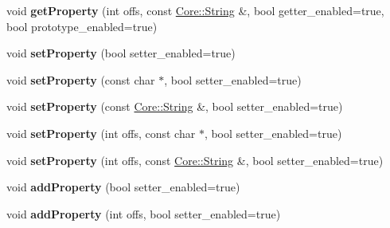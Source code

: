 \begin{DoxyCompactItemize}
\item 
void {\bfseries get\+Property} (int offs, const \hyperlink{class_object_script_1_1_o_s_1_1_core_1_1_string}{Core\+::\+String} \&, bool getter\+\_\+enabled=true, bool prototype\+\_\+enabled=true)\hypertarget{class_object_script_1_1_o_s_aa1d8e395f186e6a89b3d6b282f10697e}{}\label{class_object_script_1_1_o_s_aa1d8e395f186e6a89b3d6b282f10697e}

\item 
void {\bfseries set\+Property} (bool setter\+\_\+enabled=true)\hypertarget{class_object_script_1_1_o_s_a05fb5664fdfe69bc4eb09a4e045d1c22}{}\label{class_object_script_1_1_o_s_a05fb5664fdfe69bc4eb09a4e045d1c22}

\item 
void {\bfseries set\+Property} (const char $\ast$, bool setter\+\_\+enabled=true)\hypertarget{class_object_script_1_1_o_s_a3f09b948d4574c3669be6f2f16286718}{}\label{class_object_script_1_1_o_s_a3f09b948d4574c3669be6f2f16286718}

\item 
void {\bfseries set\+Property} (const \hyperlink{class_object_script_1_1_o_s_1_1_core_1_1_string}{Core\+::\+String} \&, bool setter\+\_\+enabled=true)\hypertarget{class_object_script_1_1_o_s_ac48a730971463f16f6ab1e92e48fb5db}{}\label{class_object_script_1_1_o_s_ac48a730971463f16f6ab1e92e48fb5db}

\item 
void {\bfseries set\+Property} (int offs, const char $\ast$, bool setter\+\_\+enabled=true)\hypertarget{class_object_script_1_1_o_s_a8174c756017c9c8793c735b4dcd29d9a}{}\label{class_object_script_1_1_o_s_a8174c756017c9c8793c735b4dcd29d9a}

\item 
void {\bfseries set\+Property} (int offs, const \hyperlink{class_object_script_1_1_o_s_1_1_core_1_1_string}{Core\+::\+String} \&, bool setter\+\_\+enabled=true)\hypertarget{class_object_script_1_1_o_s_a37bd9a57e59f449b0c6940863f7bc49d}{}\label{class_object_script_1_1_o_s_a37bd9a57e59f449b0c6940863f7bc49d}

\item 
void {\bfseries add\+Property} (bool setter\+\_\+enabled=true)\hypertarget{class_object_script_1_1_o_s_a3303f9dc35fdf8298b320b5457c6c640}{}\label{class_object_script_1_1_o_s_a3303f9dc35fdf8298b320b5457c6c640}

\item 
void {\bfseries add\+Property} (int offs, bool setter\+\_\+enabled=true)\hypertarget{class_object_script_1_1_o_s_a1454b1480700f43f6e994874f61e47b6}{}\label{class_object_script_1_1_o_s_a1454b1480700f43f6e994874f61e47b6}


\end{DoxyCompactItemize}
